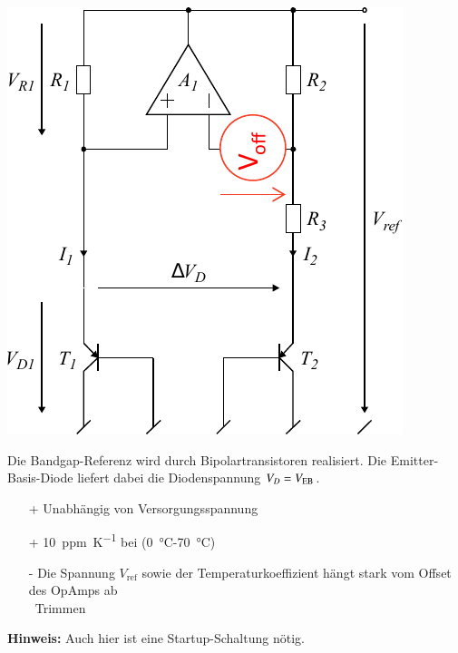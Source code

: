 \begin{minipage}[t]{0.4\columnwidth}
    \includegraphics[width=\columnwidth, align=t]{images/13_bandgap_referenz.pdf}
\end{minipage}
\hfill
\begin{minipage}[t]{0.58\columnwidth}
    Die Bandgap-Referenz wird durch Bipolartransistoren realisiert.
    Die Emitter-Basis-Diode liefert dabei die Diodenspannung $V_D = V_{\rm EB}$.

    \smallskip

    \begin{itemize}
        \item[+] Unabhängig von Versorgungsspannung
        \item[+] \qty{10}{ppm\per\kelvin} bei (\qty{0}{\degreeCelsius}-\qty{70}{\degreeCelsius})
        \item[-] Die Spannung $V_\mathrm{ref}$ sowie der Temperaturkoeffizient hängt stark vom Offset des OpAmps ab\\
            \textrightarrow\ Trimmen
    \end{itemize}

    \smallskip

    \textbf{Hinweis:} Auch hier ist eine Startup-Schaltung nötig.
\end{minipage}

